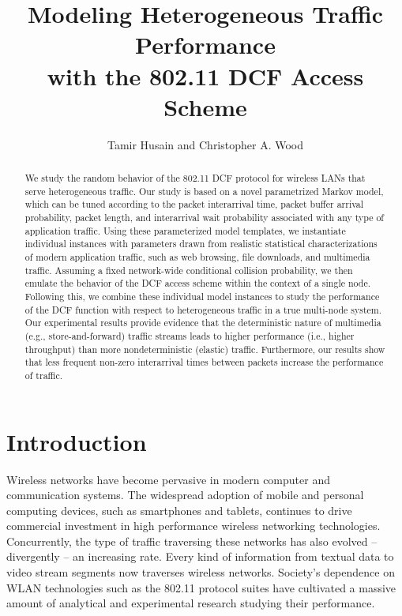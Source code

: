 \documentclass{llncs}
\begin{document}
\mainmatter
\title{Modeling Heterogeneous Traffic Performance \\ with the 802.11 DCF Access Scheme}
\author{Tamir Husain and Christopher A. Wood}
\maketitle

\begin{abstract}
We study the random behavior of the 802.11 DCF protocol for wireless LANs that serve heterogeneous traffic. Our study is based on a novel parametrized Markov model, which can be tuned according to the packet interarrival time, packet buffer arrival probability, packet length, and interarrival wait probability associated with any type of application traffic. Using these parameterized model templates, we instantiate individual instances with parameters drawn from realistic statistical characterizations of modern application traffic, such as web browsing, file downloads, and multimedia traffic. Assuming a fixed network-wide conditional collision probability, we then emulate the behavior of the DCF access scheme within the context of a single node. Following this, we combine these individual model instances to study the performance of the DCF function with respect to heterogeneous traffic in a true multi-node system. Our experimental results provide evidence that the deterministic nature of multimedia (e.g., store-and-forward) traffic streams leads to higher performance (i.e., higher throughput) than more nondeterministic (elastic) traffic. Furthermore, our results show that less frequent non-zero interarrival times between packets increase the performance of traffic.
\end{abstract}

\section{Introduction}
Wireless networks have become pervasive in modern computer and communication systems. The widespread adoption of mobile and personal computing devices, such as smartphones and tablets, continues to drive commercial investment in high performance wireless networking technologies. Concurrently, the type of traffic traversing these networks has also evolved -- divergently -- an increasing rate. Every kind of information from textual data to video stream segments now traverses wireless networks. Society's dependence on WLAN technologies such as the 802.11 protocol suites have cultivated a massive amount of analytical and experimental research studying their performance. 
\end{document}
